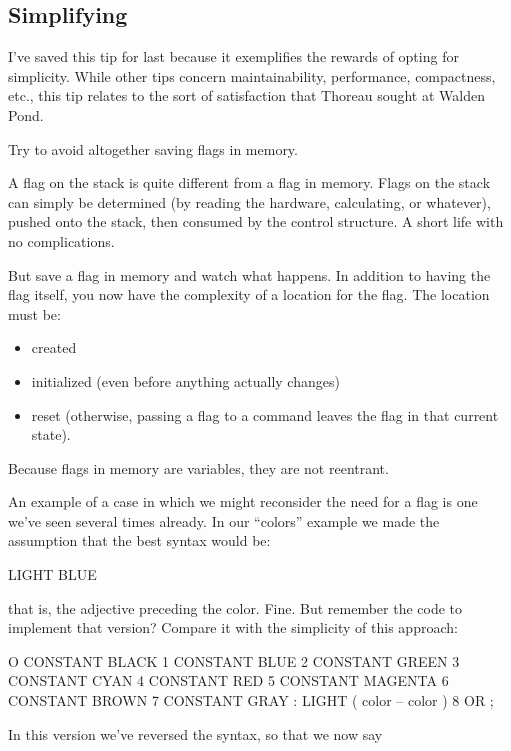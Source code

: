 \subsection{Simplifying}%

I've saved this tip for last because it exemplifies the rewards of opting for
simplicity. While other tips concern maintainability, performance,
compactness, etc., this tip relates to the sort of satisfaction that Thoreau
sought at Walden Pond.

\begin{tip}
Try to avoid altogether saving flags in memory.
\end{tip}
A flag on the stack is quite different from a flag in memory. Flags on the
stack can simply be determined (by reading the hardware, calculating, or
whatever), pushed onto the stack, then consumed by the control structure.
A short life with no complications.

But save a flag in memory and watch what happens. In addition to
having the flag itself, you now have the complexity of a location for the
flag. The location must be:

\begin{itemize}
\item created
\item initialized (even before anything actually changes)
\item reset (otherwise, passing a flag to a command leaves the flag in that current
state).
\end{itemize}
Because flags in memory are variables, they are not reentrant.

An example of a case in which we might reconsider the need for a
flag is one we've seen several times already. In our ``colors'' example we
made the assumption that the best syntax would be:

\begin{Code}
LIGHT BLUE
\end{Code}
that is, the adjective  preceding the color. Fine. But remember the
code to implement that version? Compare it with the simplicity of this
approach:

\begin{Code}
O CONSTANT BLACK    1 CONSTANT BLUE    2 CONSTANT GREEN
3 CONSTANT CYAN     4 CONSTANT RED     5 CONSTANT MAGENTA
6 CONSTANT BROWN    7 CONSTANT GRAY
: LIGHT   ( color -- color )  8 OR ;
\end{Code}
In this version we've reversed the syntax, so that we now say

